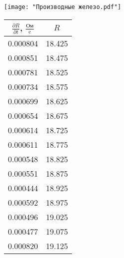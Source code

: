 \documentclass[12pt,a4paper]{article}
\begin{document}
\begin{figure}\CenterFloatBoxes
	\begin{floatrow}
		{
			
			\texttt{[image: "Производные железо.pdf"]}
			
		}
		\killfloatstyle{}
		{	\footnotesize
			\begin{tabular}{|c|c|}
				
				\hline
				$\frac{\partial R}{\partial t}$, $\frac{\text{Ом}}{\text{c}}$ &        $R$ \text{Ом}\\ \hline
				0.000804 & 18.425 \\ \hline
				0.000851 & 18.475 \\ \hline
				0.000781 & 18.525 \\ \hline
				0.000734 & 18.575 \\ \hline
				0.000699 & 18.625 \\ \hline
				0.000654 & 18.675 \\ \hline
				0.000614 & 18.725 \\ \hline
				0.000611 & 18.775 \\ \hline
				0.000548 & 18.825 \\ \hline
				0.000551 & 18.875 \\ \hline
				0.000444 & 18.925 \\ \hline
				0.000592 & 18.975 \\ \hline
				0.000496 & 19.025 \\ \hline
				0.000477 & 19.075 \\ \hline
				0.000820 & 19.125 \\ \hline
			\end{tabular}
			
		}
	\end{floatrow}
\end{figure}
\end{document}
